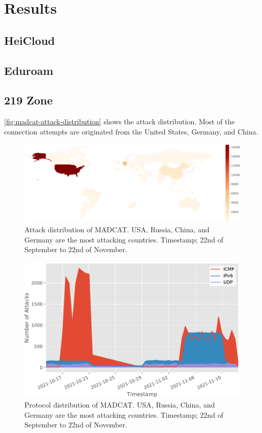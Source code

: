 \section{Results}

\subsection{HeiCloud}

\subsection{Eduroam}

\subsection{219 Zone}

\autoref{fig:madcat-attack-distribution} shows the attack distribution.
Most of the connection attempts are originated from the United States, Germany, and China.

\begin{figure}[ht]
    \centering
    \includegraphics[width=\textwidth]{figures/madcat-overview-map.pdf}
    \caption[Attack distribution of MADCAT]{Attack distribution of MADCAT. USA, Russia, China, and Germany are the most attacking countries. Timestamp; 22nd of September to 22nd of November.}
    \label{fig:madcat-attack-distribution}
\end{figure}

\begin{figure}[ht]
    \centering
    \includegraphics[width=\textwidth]{figures/madcat-protocol-usage.pdf}
    \caption[Protocol distribution of MADCAT]{Protocol distribution of MADCAT. USA, Russia, China, and Germany are the most attacking countries. Timestamp; 22nd of September to 22nd of November.}
    \label{fig:madcat-protocols}
\end{figure}
